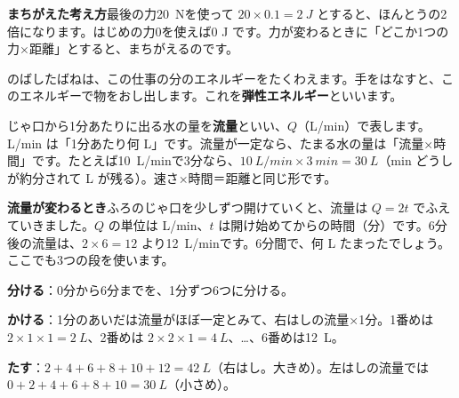 \noindent\textbf{まちがえた考え方}\quad 最後の力\qty{20}{N}を使って $20\times0.1=\qty{2}{J}$ とすると、ほんとうの2倍になります。はじめの力0を使えば0 J です。力が変わるときに「どこか1つの力×距離」とすると、まちがえるのです。

のばしたばねは、この仕事の分のエネルギーをたくわえます。手をはなすと、このエネルギーで物をおし出します。これを\textbf{弾性エネルギー}といいます。


\label{bk:5-12:ryuuryou}じゃ口から1分あたりに出る水の量を\textbf{流量}といい、$Q$（L/min）で表します。L/min は「1分あたり何 L」です。流量が一定なら、たまる水の量は「流量×時間」です。たとえば\qty{10}{L/min}で3分なら、$\qty{10}{L/min}\times\qty{3}{min}=\qty{30}{L}$（min どうしが約分されて L が残る）。速さ×時間＝距離と同じ形です。

\noindent\textbf{流量が変わるとき}\quad ふろのじゃ口を少しずつ開けていくと、流量は $Q=2t$ でふえていきました。$Q$ の単位は L/min、$t$ は開け始めてからの時間（分）です。6分後の流量は、$2\times6=12$ より\qty{12}{L/min}です。6分間で、何 L たまったでしょう。ここでも3つの段を使います。

\begin{enumerate}[label={\bkcircled[bkTheme]{\arabic*}}, leftmargin=2.4\zw, itemsep=1pt, topsep=2pt]
\item \textbf{分ける}：0分から6分までを、1分ずつ6つに分ける。
\item \textbf{かける}：1分のあいだは流量がほぼ一定とみて、右はしの流量×1分。1番めは $2\times1\times1=\qty{2}{L}$、2番めは $2\times2\times1=\qty{4}{L}$、…、6番めは\qty{12}{L}。
\item \textbf{たす}：$2+4+6+8+10+12=\qty{42}{L}$（右はし。大きめ）。左はしの流量では $0+2+4+6+8+10=\qty{30}{L}$（小さめ）。
\end{enumerate}

